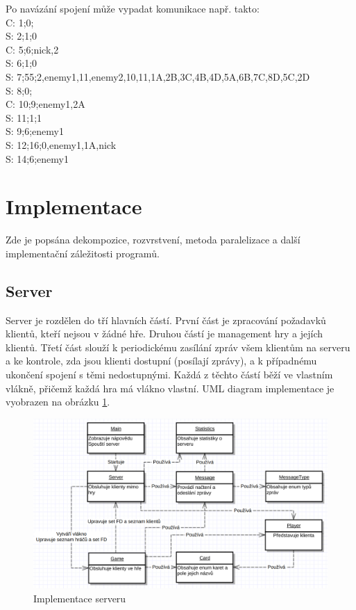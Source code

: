 \documentclass[12pt, a4paper]{article}
\begin{document}
		Po navázání spojení může vypadat komunikace např. takto:\\
		C: 1;0;\\
		S: 2;1;0\\
		C: 5;6;nick,2\\
		S: 6;1;0\\
		S: 7;55;2,enemy1,11,enemy2,10,11,1A,2B,3C,4B,4D,5A,6B,7C,8D,5C,2D\\
		S: 8;0;\\
		C: 10;9;enemy1,2A\\
		S: 11;1;1\\
		S: 9;6;enemy1\\
		S: 12;16;0,enemy1,1A,nick\\
		S: 14;6;enemy1
		
	\section{Implementace}
	Zde je popsána dekompozice, rozvrstvení, metoda paralelizace a další implementační záležitosti programů.
	
		\subsection{Server}
		Server je rozdělen do tří hlavních částí. První část je zpracování požadavků klientů, kteří nejsou v žádné hře. Druhou částí je management hry a jejích klientů. Třetí část slouží k periodickému zasílání  zpráv všem klientům na serveru a ke kontrole, zda jsou klienti dostupní (posílají  zprávy), a k případnému ukončení spojení s těmi nedostupnými. Každá z těchto částí běží ve vlastním vlákně, přičemž každá hra má vlákno vlastní. UML diagram implementace je vyobrazen na obrázku \ref{Server}.
		\begin{figure}[ht!]
			\centering
			\caption{Implementace serveru}
			\label{Server}
			\includegraphics[width=13cm]{img/Server.png}
		\end{figure}
	
\end{document}
